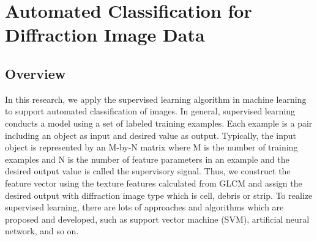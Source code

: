 
\renewcommand{\thechapter}{3}

\chapter{Automated Classification for Diffraction Image Data}

\section{Overview}
In this research, we apply the supervised learning algorithm in machine learning to support automated classification of images. In general, supervised learning conducts a model using a set of labeled training examples\cite{Mehryar}. Each example is a pair including an object as input and desired value as output. Typically, the input object is represented by an M-by-N matrix where M is the number of training examples and N is the number of feature parameters in an example and the desired output value is called the supervisory signal. Thus, we construct the feature vector using the texture features calculated from GLCM and assign the desired output with diffraction image type which is cell, debris or strip. To realize supervised learning, there are lots of approaches and algorithms which are proposed and developed, such as support vector machine (SVM)\cite{Cortes}, artificial neural network\cite{McCulloch}, and so on.

